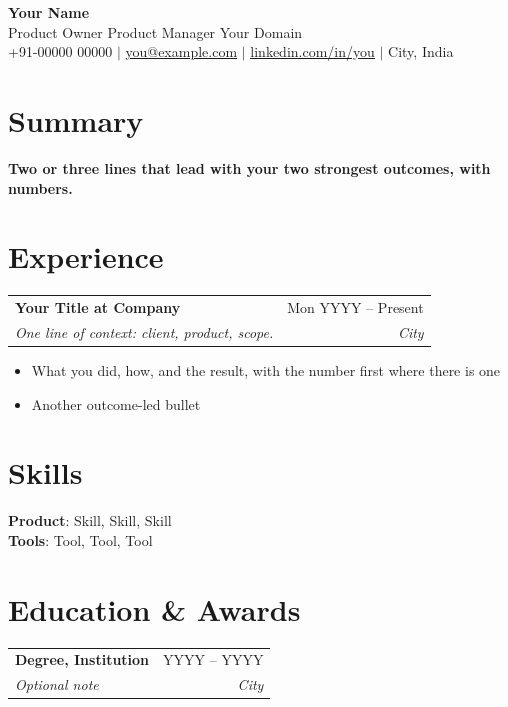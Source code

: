 \documentclass[letterpaper,10.5pt]{article}
\makeatletter
\newcommand{\role}[4]{%
  \begin{tabularx}{0.985\linewidth}[t]{@{}X@{}r@{}}
  \textbf{\large #1} & #2\\
  \textit{\small #3} & \textit{\small #4}
  \end{tabularx}\vspace{-3pt}}
\newenvironment{items}{\begin{itemize}[leftmargin=0.32in,itemsep=0pt,parsep=0pt,topsep=1pt,label=\textbullet]\fontsize{10.1}{12.2}\selectfont}{\end{itemize}\vspace{2pt}}
\newcommand{\lnk}[2]{\href{#1}{\underline{#2}}}
\makeatother
\begin{document}
\begin{center}
{\fontsize{24}{28}\selectfont\textbf{Your Name}}\\[2pt]
{\large Product Owner \textbar{} Product Manager \textbullet{} Your Domain}\\[2pt]
\small +91-00000 00000 $|$ \lnk{mailto:you@example.com}{you@example.com} $|$ \lnk{https://linkedin.com/in/you}{linkedin.com/in/you} $|$ City, India
\end{center}
\vspace{-6pt}

\section{Summary}
\leftskip=0.15in
{\fontsize{10.3}{12.6}\selectfont\textbf{Two or three lines that lead with your two strongest outcomes, with numbers.}}
\par\leftskip=0pt

\section{Experience}
\leftskip=0.15in
\role{Your Title at Company}{Mon YYYY -- Present}{One line of context: client, product, scope.}{City}
\begin{items}
\item What you did, how, and the result, with the number first where there is one
\item Another outcome-led bullet
\end{items}
\par\leftskip=0pt

\section{Skills}
\leftskip=0.15in
{\fontsize{10.1}{12.3}\selectfont
\textbf{Product}: Skill, Skill, Skill\\
\textbf{Tools}: Tool, Tool, Tool\par}
\par\leftskip=0pt

\section{Education \& Awards}
\leftskip=0.15in
\role{Degree, Institution}{YYYY -- YYYY}{Optional note}{City}
\par\leftskip=0pt
\end{document}

